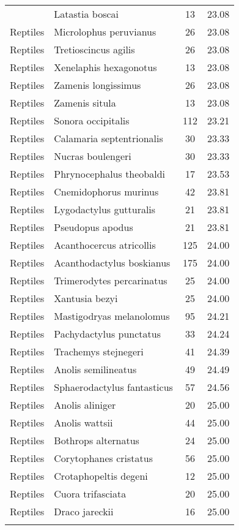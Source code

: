\begin{longtable}{llcc}
{  Reptiles & Latastia boscai &  13 & 23.08 \\ 
  Reptiles & Microlophus peruvianus &  26 & 23.08 \\ 
  Reptiles & Tretioscincus agilis &  26 & 23.08 \\ 
  Reptiles & Xenelaphis hexagonotus &  13 & 23.08 \\ 
  Reptiles & Zamenis longissimus &  26 & 23.08 \\ 
  Reptiles & Zamenis situla &  13 & 23.08 \\ 
  Reptiles & Sonora occipitalis & 112 & 23.21 \\ 
  Reptiles & Calamaria septentrionalis &  30 & 23.33 \\ 
  Reptiles & Nucras boulengeri &  30 & 23.33 \\ 
  Reptiles & Phrynocephalus theobaldi &  17 & 23.53 \\ 
  Reptiles & Cnemidophorus murinus &  42 & 23.81 \\ 
  Reptiles & Lygodactylus gutturalis &  21 & 23.81 \\ 
  Reptiles & Pseudopus apodus &  21 & 23.81 \\ 
  Reptiles & Acanthocercus atricollis & 125 & 24.00 \\ 
  Reptiles & Acanthodactylus boskianus & 175 & 24.00 \\ 
  Reptiles & Trimerodytes percarinatus &  25 & 24.00 \\ 
  Reptiles & Xantusia bezyi &  25 & 24.00 \\ 
  Reptiles & Mastigodryas melanolomus &  95 & 24.21 \\ 
  Reptiles & Pachydactylus punctatus &  33 & 24.24 \\ 
  Reptiles & Trachemys stejnegeri &  41 & 24.39 \\ 
  Reptiles & Anolis semilineatus &  49 & 24.49 \\ 
  Reptiles & Sphaerodactylus fantasticus &  57 & 24.56 \\ 
  Reptiles & Anolis aliniger &  20 & 25.00 \\ 
  Reptiles & Anolis wattsii &  44 & 25.00 \\ 
  Reptiles & Bothrops alternatus &  24 & 25.00 \\ 
  Reptiles & Corytophanes cristatus &  56 & 25.00 \\ 
  Reptiles & Crotaphopeltis degeni &  12 & 25.00 \\ 
  Reptiles & Cuora trifasciata &  20 & 25.00 \\ 
  Reptiles & Draco jareckii &  16 & 25.00 \\ 
}
\end{longtable}
